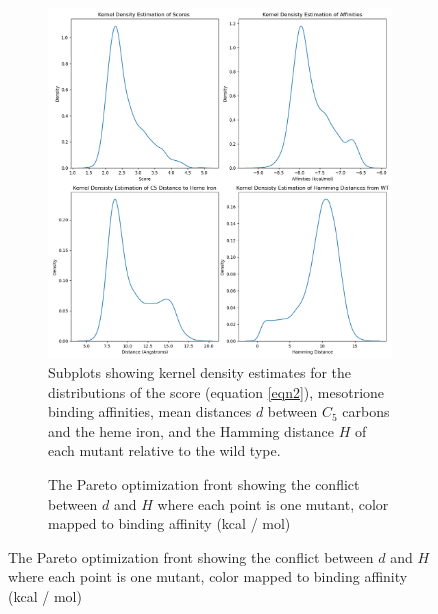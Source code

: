 \documentclass{article}
\begin{document}
\begin{figure}[H]
	\caption{\label{experiment2} Summary statistics of virtual directed evolution experiment 2}
	\begin{subfigure}{0.9\textwidth}
		\caption{\label{exp2-description} Subplots showing kernel density estimates for the distributions of the score (equation \ref{eqn2}), mesotrione binding affinities, mean distances $d$ between $C_5$ carbons and the heme iron, and the Hamming distance $H$ of each mutant relative to the wild type.}
		\includegraphics[width=\linewidth]{figs/uvwsl-description.png}
	\end{subfigure}
	\begin{subfigure}{0.49\textwidth}
		\caption{\label{pareto} The Pareto optimization front showing the conflict between $d$ and $H$ where each point is one mutant, color mapped to binding affinity (kcal / mol)}

\end{subfigure}
\end{figure}
\end{document}
